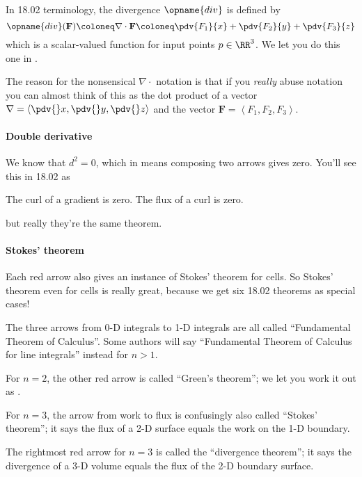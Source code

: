 \begin{itemize}
	\ii In 18.02 terminology, the divergence $\opname{div}$ is defined by
	\[ \opname{div}(\mathbf{F}) \coloneq \nabla \cdot \mathbf{F} \coloneq
		\pdv{F_1}{x} + \pdv{F_2}{y} + \pdv{F_3}{z} \]
	which is a scalar-valued function for input points $p \in \RR^3$.
	We let you do this one in .

	The reason for the nonsensical $\nabla \cdot$ notation
	is that if you \emph{really} abuse notation you can almost think of this as
	the dot product of a vector $\nabla = \left< \pdv{}x, \pdv{}y, \pdv{}z \right>$
	and the vector $\mathbf{F} = \left< F_1, F_2, F_3 \right>$.
\end{itemize}

\paragraph{Double derivative}
We know that $d^2=0$,
which in  means composing two arrows gives zero.
You'll see this in 18.02 as
\begin{itemize}
	\ii The curl of a gradient is zero.
	\ii The flux of a curl is zero.
\end{itemize}
but really they're the same theorem.

\paragraph{Stokes' theorem}
Each red arrow also gives an instance of Stokes' theorem for cells.
So Stokes' theorem even for cells is really great,
because we get six 18.02 theorems as special cases!
\begin{itemize}
	\ii The three arrows from 0-D integrals to 1-D integrals are all called
	``Fundamental Theorem of Calculus''.
	Some authors will say ``Fundamental Theorem of Calculus for line integrals''
	instead for $n > 1$.

	\ii For $n=2$, the other red arrow is called ``Green's theorem'';
	we let you work it out as .

	\ii For $n=3$, the arrow from work to flux is confusingly also called
	``Stokes' theorem''; it says the flux of a 2-D surface equals the work on the 1-D boundary.

	\ii The rightmost red arrow for $n = 3$
	is called the ``divergence theorem'';
	it says the divergence of a 3-D volume equals the flux of the 2-D boundary surface.
\end{itemize}



